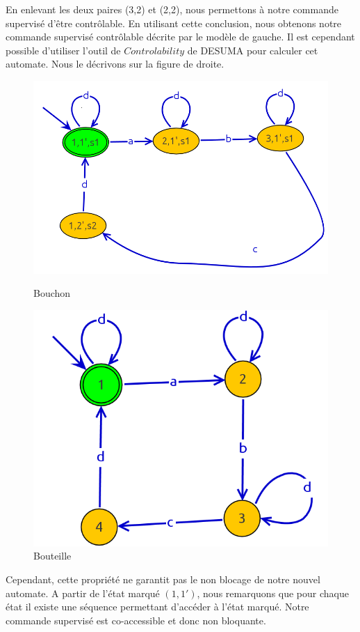 En enlevant les deux paires (3,2) et (2,2), nous permettons à notre commande supervisé d'être contrôlable. En utilisant cette conclusion, nous obtenons notre commande supervisé contrôlable décrite par le modèle de gauche. Il est cependant possible d'utiliser l'outil de $Controlability$ de DESUMA pour calculer cet automate. Nous le décrivons sur la figure de droite.\begin{figure}[!ht]
\begin{minipage}{.5\textwidth}
\centering
\includegraphics[width=\textwidth]{./II/images/P_S_automate_ctrb_manuel.png}
\caption{Bouchon}
\end{minipage} \hfill
\begin{minipage}{.5\textwidth}
\centering
\includegraphics[width=\textwidth]{./II/images/P_S_automate_ctrb_desuma.png}
\caption{Bouteille}
\end{minipage}
\end{figure}


Cependant, cette propriété ne garantit pas le non blocage de notre nouvel automate. A partir de l'état marqué $(1,1')$, nous remarquons que pour chaque état il existe une séquence permettant d'accéder à l'état marqué. Notre commande supervisé est co-accessible et donc non bloquante.